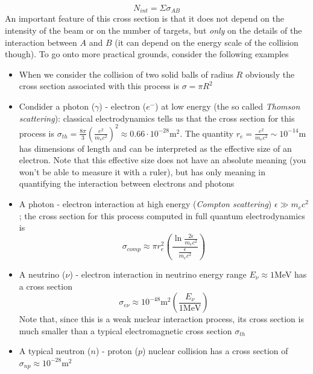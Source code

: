 \begin{equation}
N_{int}=\Sigma \sigma_{AB}
\end{equation}
An important feature of this cross section is that it does not depend on the intensity of the beam or on the number of targets, but \textit{only} on the details of the interaction between $A$ and $B$ (it can depend on the energy scale of the collision though). To go onto more practical grounds, consider the following examples
\begin{itemize}
\item When we consider the collision of two solid balls of radius $R$ obviously the cross section associated with this process is $\sigma=\pi R^2$
\item Condider a photon ($\gamma$) - electron ($e^-$) at low energy (the so called \textit{Thomson scattering}): classical electrodynamics tells us that the cross section for this process is $\sigma_{th}=\frac{8\pi}{3}\left(\frac{e^2}{m_ec^2}\right)^2\approx0.66\cdot 10^{-28}\mathrm{m}^2$. The quantity $r_e=\frac{e^2}{m_ec^2}\sim 10^{-14}$m has dimensions of length and can be interpreted as the effective size of an electron. Note that this effective size does not have an absolute meaning (you won't be able to measure it with a ruler), but has only meaning in quantifying the interaction between electrons and photons
\item A photon - electron interaction at high energy (\textit{Compton scattering}) $\epsilon \gg m_ec^2$; the cross section for this process computed in full quantum electrodynamics is 
\begin{equation}
\sigma_{comp}\approx \pi r_e^2\left(\frac{\ln{\frac{2\epsilon}{m_ec^2}}}{\frac{\epsilon}{m_ec^2}}\right)
\end{equation} 
\item A neutrino ($\nu$) - electron interaction in neutrino energy range $E_\nu\approx 1$MeV has a cross section 
\begin{equation}
\label{neutel}
\sigma_{e\nu}\approx 10^{-48}\mathrm{m}^2\left(\frac{E_\nu}{1\mathrm{MeV}}\right)
\end{equation}
Note that, since this is a weak nuclear interaction process, its cross section is much smaller than a typical electromagnetic cross section $\sigma_{th}$
\item A typical neutron ($n$) - proton ($p$) nuclear collision has a cross section of $\sigma_{np}\approx 10^{-28}$m$^2$ 
\end{itemize} 

